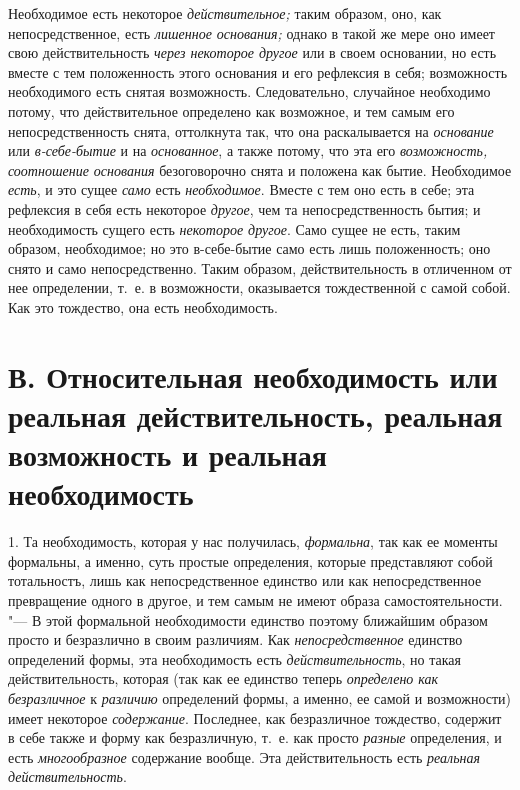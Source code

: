 Необходимое есть некоторое {\em действительное;} таким
образом, оно, как непосредственное, есть {\em лишенное
основания;} однако в такой же мере оно имеет свою действительность
{\em через некоторое другое} или в своем основании, но
есть вместе с тем положенность этого основания и его рефлексия в себя;
возможность необходимого есть снятая возможность. Следовательно, случайное
необходимо потому, что действительное определено как возможное, и тем самым
его непосредственность снята, оттолкнута так, что она раскалывается на
{\em основание} или {\em в-себе-бытие} и на
{\em основанное}, а также потому, что эта его
{\em возможность, соотношение основания} безоговорочно
снята и положена как бытие. Необходимое {\em есть}, и это сущее {\em само} есть
{\em необходимое}. Вместе с тем оно есть в себе; эта
рефлексия в себя есть некоторое {\em другое}, чем та
непосредственность бытия; и необходимость сущего есть
{\em некоторое другое}. Само сущее не есть, таким
образом, необходимое; но это в-себе-бытие само есть лишь положенность; оно
снято и само непосредственно. Таким образом, действительность в отличенном
от нее определении, т.~е. в возможности, оказывается тождественной с самой
собой. Как это тождество, она есть необходимость.


\section[В. Относительная необходимость или реальная действительность, реальная возможность и реальная необходимость]%
{В. Относительная необходимость или реальная действительность, реальная возможность и реальная необходимость}

1. Та необходимость, которая у нас получилась,
{\em формальна}, так как ее моменты формальны, а
именно, суть простые определения, которые представляют собой тотальностъ,
лишь как непосредственное единство или как непосредственное превращение
одного в другое, и тем самым не имеют образа самостоятельности. "--- В этой
формальной необходимости единство поэтому ближайшим образом просто и
безразлично в своим различиям. Как
{\em непосредственное} единство определений формы, эта
необходимость есть {\em действительность}, но такая
действительность, которая (так как ее единство теперь
{\em определено как безразличное} к
{\em различию} определений формы, а именно, ее самой и
возможности) имеет некоторое {\em содержание}.
Последнее, как безразличное тождество, содержит в себе также и форму как
безразличную, т.~е. как просто {\em разные}
определения, и есть {\em многообразное} содержание
вообще. Эта действительность есть {\em реальная действительность}.

